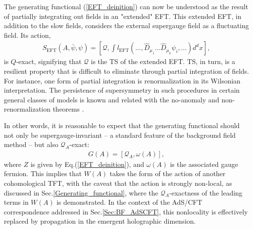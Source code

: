 \documentclass[final,5p,10pt,times,twocolumn,year]{elsarticle}
\begin{document}
The generating functional (\ref{EFT_deinition}) can now be understood as the result of partially integrating out fields in an "extended" EFT. This extended EFT, in addition to the slow fields, considers the external supergauge field as a fluctuating field. Its action,
\begin{eqnarray}
    S_\text{EFT}(A,\bar\psi,\psi) = [\mathcal{Q},\int l_\text{EFT}(..., \hat D_{\mu_1} ... \hat D_{\mu_k} \psi_i,...)d^{d}x],
\end{eqnarray}
is $Q$-exact, signifying that $\mathcal{Q}$ is the TS of the extended EFT. TS, in turn, is a resilient property that is difficult to eliminate through partial integration of fields. For instance, one form of partial integration is renormalization in its Wilsonian interpretation. The persistence of supersymmetry in such procedures in certain general classes of models is known and related with the no-anomaly and non-renormalization theorems \cite{SEIBERG1993469}.

In other words, it is reasonable to expect that the generating functional should not only be supergauge-invariant -- a standard feature of the background field method -- but also $\mathcal Q_{A}$-exact:
\begin{eqnarray}
     G(A) = [\mathcal{Q}_{A}, \omega(A)],\label{QExactGeneratingFunctional}
\end{eqnarray}
where $Z$ is given by Eq.(\ref{EFT_deinition}), and $\omega(A)$ is the associated gauge fermion. This implies that $W(A)$ takes the form of the action of another cohomological TFT, with the caveat that the action is strongly non-local, as discussed in Sec.\ref{Generating_functional}, where the $\mathcal Q_A$-exactness of the leading terms in $W(A)$ is demonstrated. In the context of the AdS/CFT correspondence addressed in Sec.\ref{Sec:BF_AdSCFT}, this nonlocality is effectively replaced by propagation in the emergent holographic dimension.

\end{document}
